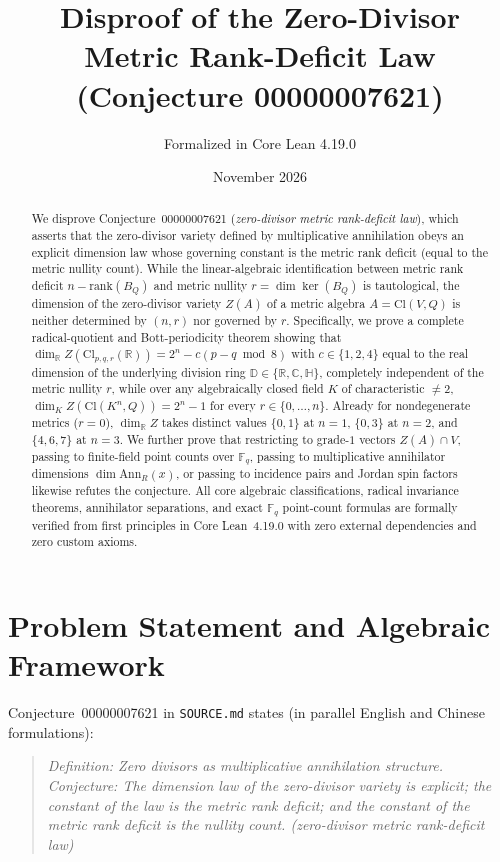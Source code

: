 \documentclass[11pt,a4paper]{article}
\title{\textbf{Disproof of the Zero-Divisor Metric Rank-Deficit Law\\
(Conjecture 00000007621)}}
\author{Formalized in Core Lean 4.19.0}
\date{November 2026}
\theoremstyle{definition}
\theoremstyle{remark}
\newcommand{\Cl}{\mathrm{Cl}}
\newcommand{\Ann}{\mathrm{Ann}}
\newcommand{\rank}{\mathrm{rank}}
\begin{document}
\maketitle

\begin{abstract}
We disprove Conjecture~00000007621 (\emph{zero-divisor metric rank-deficit law}), which asserts that the zero-divisor variety defined by multiplicative annihilation obeys an explicit dimension law whose governing constant is the metric rank deficit (equal to the metric nullity count). While the linear-algebraic identification between metric rank deficit $n - \rank(B_Q)$ and metric nullity $r = \dim \ker(B_Q)$ is tautological, the dimension of the zero-divisor variety $Z(A)$ of a metric algebra $A = \Cl(V, Q)$ is neither determined by $(n, r)$ nor governed by $r$. Specifically, we prove a complete radical-quotient and Bott-periodicity theorem showing that $\dim_{\mathbb{R}} Z(\Cl_{p,q,r}(\mathbb{R})) = 2^n - c(p - q \bmod 8)$ with $c \in \{1, 2, 4\}$ equal to the real dimension of the underlying division ring $\mathbb{D} \in \{\mathbb{R}, \mathbb{C}, \mathbb{H}\}$, completely independent of the metric nullity $r$, while over any algebraically closed field $K$ of characteristic $\neq 2$, $\dim_K Z(\Cl(K^n, Q)) = 2^n - 1$ for every $r \in \{0, \dots, n\}$. Already for nondegenerate metrics ($r = 0$), $\dim_{\mathbb{R}} Z$ takes distinct values $\{0, 1\}$ at $n = 1$, $\{0, 3\}$ at $n = 2$, and $\{4, 6, 7\}$ at $n = 3$. We further prove that restricting to grade-$1$ vectors $Z(A) \cap V$, passing to finite-field point counts over $\mathbb{F}_q$, passing to multiplicative annihilator dimensions $\dim \Ann_R(x)$, or passing to incidence pairs and Jordan spin factors likewise refutes the conjecture. All core algebraic classifications, radical invariance theorems, annihilator separations, and exact $\mathbb{F}_q$ point-count formulas are formally verified from first principles in Core Lean~4.19.0 with zero external dependencies and zero custom axioms.
\end{abstract}

\section{Problem Statement and Algebraic Framework}

Conjecture~00000007621 in \texttt{SOURCE.md} states (in parallel English and Chinese formulations):
\begin{quote}
\emph{Definition: Zero divisors as multiplicative annihilation structure. Conjecture: The dimension law of the zero-divisor variety is explicit; the constant of the law is the metric rank deficit; and the constant of the metric rank deficit is the nullity count. (zero-divisor metric rank-deficit law)}
\end{quote}
\end{document}
